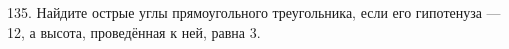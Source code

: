 135. Найдите острые углы прямоугольного треугольника, если его гипотенуза --- 12, а высота, проведённая к ней, равна 3.\\
